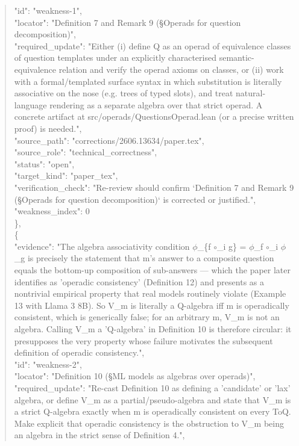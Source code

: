 \documentclass[11pt]{article}
\begin{document}
\begin{quote}
      "id": "weakness-1",\\
      "locator": "Definition 7 and Remark 9 (§Operads for question decomposition)",\\
      "required\_update": "Either (i) define Q as an operad of equivalence classes of question templates under an explicitly characterised semantic-equivalence relation and verify the operad axioms on classes, or (ii) work with a formal/templated surface syntax in which substitution is literally associative on the nose (e.g. trees of typed slots), and treat natural-language rendering as a separate algebra over that strict operad. A concrete artifact at src/operads/QuestionsOperad.lean (or a precise written proof) is needed.",\\
      "source\_path": "corrections/2606.13634/paper.tex",\\
      "source\_role": "technical\_correctness",\\
      "status": "open",\\
      "target\_kind": "paper\_tex",\\
      "verification\_check": "Re-review should confirm `Definition 7 and Remark 9 (§Operads for question decomposition)` is corrected or justified.",\\
      "weakness\_index": 0\\
    \},\\
    \{\\
      "evidence": "The algebra associativity condition \ensuremath{\phi}\_\{f \ensuremath{\circ}\_i g\} = \ensuremath{\phi}\_f \ensuremath{\circ}\_i \ensuremath{\phi}\_g is precisely the statement that m's answer to a composite question equals the bottom-up composition of sub-answers --- which the paper later identifies as 'operadic consistency' (Definition 12) and presents as a nontrivial empirical property that real models routinely violate (Example 13 with Llama 3 8B). So V\_m is literally a Q-algebra iff m is operadically consistent, which is generically false; for an arbitrary m, V\_m is not an algebra. Calling V\_m a 'Q-algebra' in Definition 10 is therefore circular: it presupposes the very property whose failure motivates the subsequent definition of operadic consistency.",\\
      "id": "weakness-2",\\
      "locator": "Definition 10 (§ML models as algebras over operads)",\\
      "required\_update": "Re-cast Definition 10 as defining a 'candidate' or 'lax' algebra, or define V\_m as a partial/pseudo-algebra and state that V\_m is a strict Q-algebra exactly when m is operadically consistent on every ToQ. Make explicit that operadic consistency is the obstruction to V\_m being an algebra in the strict sense of Definition 4.",\\

\end{quote}
\end{document}
